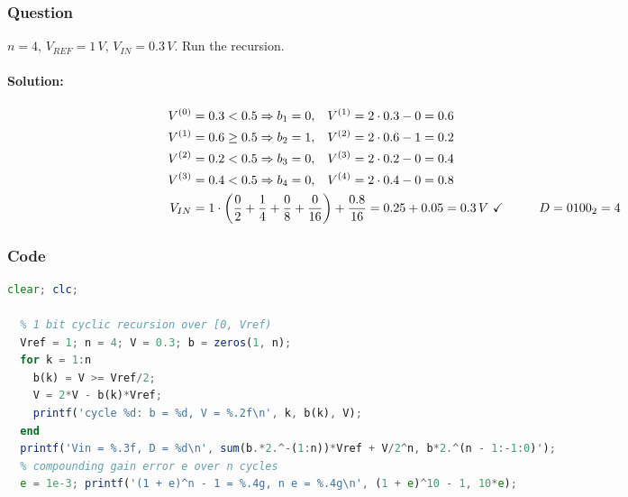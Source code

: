 \subsubsection{Question}
\(n = 4\), \(V_{REF} = 1\,V\), \(V_{IN} = 0.3\,V\). Run the recursion.
\paragraph{Solution:}
\begin{align*}
  V^{(0)} &= 0.3 < 0.5 \Rightarrow b_1 = 0, \hspace{0.3cm} V^{(1)} = 2 \cdot 0.3 - 0 = 0.6 \\
  V^{(1)} &= 0.6 \geq 0.5 \Rightarrow b_2 = 1, \hspace{0.3cm} V^{(2)} = 2 \cdot 0.6 - 1 = 0.2 \\
  V^{(2)} &= 0.2 < 0.5 \Rightarrow b_3 = 0, \hspace{0.3cm} V^{(3)} = 2 \cdot 0.2 - 0 = 0.4 \\
  V^{(3)} &= 0.4 < 0.5 \Rightarrow b_4 = 0, \hspace{0.3cm} V^{(4)} = 2 \cdot 0.4 - 0 = 0.8 \\
  V_{IN} &= 1 \cdot \left(\frac{0}{2} + \frac{1}{4} + \frac{0}{8} + \frac{0}{16}\right) + \frac{0.8}{16} = 0.25 + 0.05 = 0.3\,V \ \checkmark \hspace{1cm} D = 0100_2 = 4
\end{align*}

\subsubsection{Code}
\begin{lstlisting}[language=Octave]
  clear; clc;

  % 1 bit cyclic recursion over [0, Vref)
  Vref = 1; n = 4; V = 0.3; b = zeros(1, n);
  for k = 1:n
    b(k) = V >= Vref/2;
    V = 2*V - b(k)*Vref;
    printf('cycle %d: b = %d, V = %.2f\n', k, b(k), V);
  end
  printf('Vin = %.3f, D = %d\n', sum(b.*2.^-(1:n))*Vref + V/2^n, b*2.^(n - 1:-1:0)');
  % compounding gain error e over n cycles
  e = 1e-3; printf('(1 + e)^n - 1 = %.4g, n e = %.4g\n', (1 + e)^10 - 1, 10*e);
\end{lstlisting}
